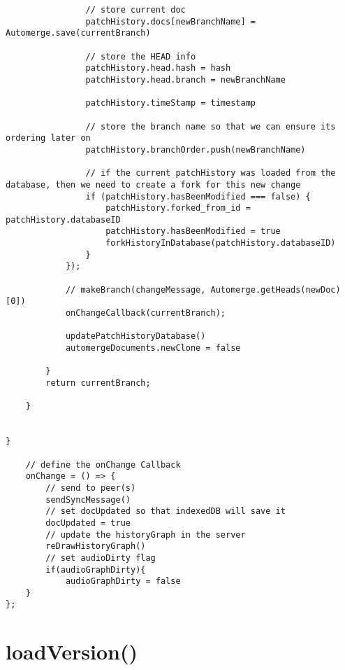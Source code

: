 \begin{lstlisting}
                // store current doc
                patchHistory.docs[newBranchName] = Automerge.save(currentBranch)
                
                // store the HEAD info
                patchHistory.head.hash = hash
                patchHistory.head.branch = newBranchName

                patchHistory.timeStamp = timestamp

                // store the branch name so that we can ensure its ordering later on
                patchHistory.branchOrder.push(newBranchName)

                // if the current patchHistory was loaded from the database, then we need to create a fork for this new change
                if (patchHistory.hasBeenModified === false) {
                    patchHistory.forked_from_id = patchHistory.databaseID
                    patchHistory.hasBeenModified = true
                    forkHistoryInDatabase(patchHistory.databaseID)
                }
            });
           
            // makeBranch(changeMessage, Automerge.getHeads(newDoc)[0])
            onChangeCallback(currentBranch);

            updatePatchHistoryDatabase()
            automergeDocuments.newClone = false

        }
        return currentBranch;

    }
    

}

    // define the onChange Callback
    onChange = () => {
        // send to peer(s)
        sendSyncMessage()
        // set docUpdated so that indexedDB will save it
        docUpdated = true
        // update the historyGraph in the server
        reDrawHistoryGraph()
        // set audioDirty flag
        if(audioGraphDirty){
            audioGraphDirty = false
    }
};

\end{lstlisting}

\section{loadVersion()}

